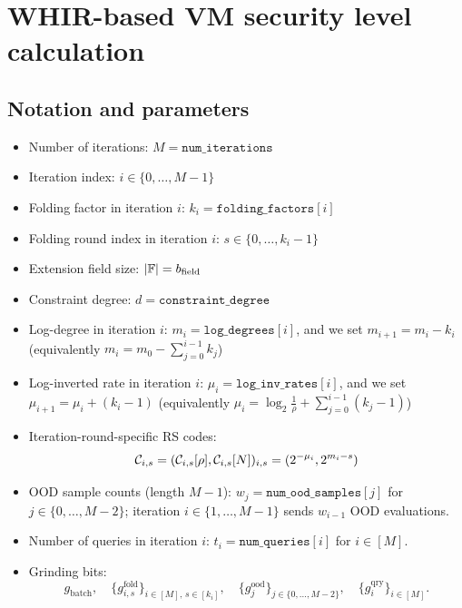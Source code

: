 \newpage

\section{WHIR-based VM security level calculation}\label{sec:whir_security_level}




\subsection{Notation and parameters}\label{sec:whir_notation}

\begin{itemize}
  \item Number of iterations: \(M = \texttt{num\_iterations}\)
  \item Iteration index: \(i \in \{0,\dots,M-1\}\)
  \item Folding factor in iteration \(i\): \(k_i = \texttt{folding\_factors}[i]\)
  \item Folding round index in iteration \(i\): \(s \in \{0,\dots,k_i-1\}\)
  \item Extension field size: \(|\mathbb{F}| = b_{\mathrm{field}}\)
  \item Constraint degree: \(d = \texttt{constraint\_degree}\)
  \item Log-degree in iteration \(i\): \(m_i = \texttt{log\_degrees}[i]\), and we set $m_{i+1} = m_i - k_i$ (equivalently $m_i = m_0 - \sum_{j=0}^{i-1} k_j$)
  \item Log-inverted rate in iteration \(i\): \(\mu_i = \texttt{log\_inv\_rates}[i]\), and we set $\mu_{i+1} = \mu_i + (k_i - 1)$ (equivalently $\mu_i = \log_2 \frac{1}{\rho} + \sum_{j=0}^{i-1}(k_j - 1)$)
  \item Iteration-round-specific RS codes:
  $$
  \mathcal{C}_{i,s}=(\mathcal{C}_{i,s}[\rho],\mathcal{C}_{i,s}[N])_{i,s}=(2^{-\mu_i},2^{m_i-s})
  $$
  \item OOD sample counts (length \(M-1\)): \(w_j = \texttt{num\_ood\_samples}[j]\) for \(j\in\{0,\ldots,M-2\}\); iteration \(i\in\{1,\ldots,M-1\}\) sends \(w_{i-1}\) OOD evaluations.
  \item Number of queries in iteration \(i\): \(t_i = \texttt{num\_queries}[i]\) for \(i\in[M]\).
  \item Grinding bits:
    \[
      g_{\mathrm{batch}},\quad
      \{g^{\mathrm{fold}}_{i,s}\}_{i\in [M],\,s\in[k_i]},\quad
      \{g^{\mathrm{ood}}_j\}_{j\in\{0,\ldots,M-2\}},\quad
      \{g^{\mathrm{qry}}_i\}_{i\in[M]}.
    \]
\end{itemize}



